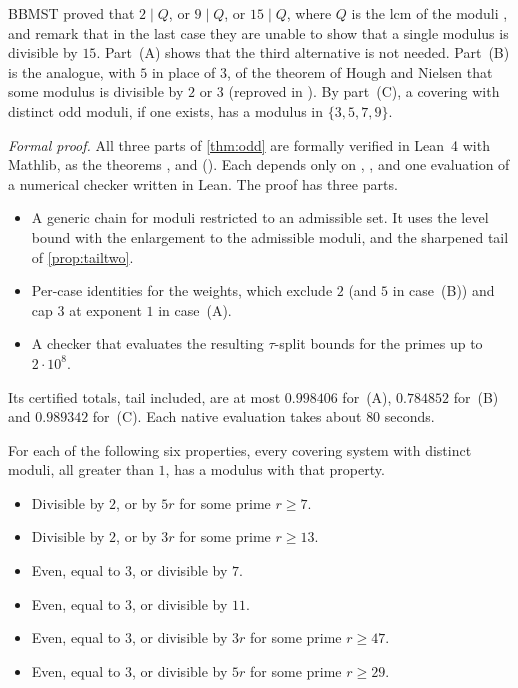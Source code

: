 BBMST proved that $2\mid Q$, or $9\mid Q$, or $15\mid Q$, where $Q$ is the lcm of the moduli
\cite[Theorem~1.4]{BBMST}, and remark that in the last case they are unable to show that a single modulus is divisible
by $15$. Part~(A) shows that the third alternative is not needed. Part~(B) is the analogue, with $5$ in place of $3$,
of the theorem of Hough and Nielsen \cite{HoughNielsen2019} that some modulus is divisible by $2$ or $3$ (reproved in
\cite[Theorem~7.1]{BBMST}). By part~(C), a covering with distinct odd moduli, if one exists, has a modulus in
$\{3,5,7,9\}$.

\emph{Formal proof.} All three parts of \cref{thm:odd} are formally verified in Lean~4 with Mathlib, as the theorems
,  and  (). Each depends only on
, ,  and one  evaluation of a numerical
checker written in Lean. The proof has three parts.
\begin{itemize}
\item A generic chain for moduli restricted to an admissible set. It uses the level bound with the enlargement to
  the admissible moduli, and the sharpened tail of \cref{prop:tailtwo}.
\item Per-case identities for the weights, which exclude $2$ (and $5$ in case~(B)) and cap $3$ at exponent $1$ in
  case~(A).
\item A checker that evaluates the resulting $\tau$-split bounds for the primes up to $2\cdot10^8$.
\end{itemize}
Its certified totals, tail included, are at most $0.998406$ for~(A), $0.784852$ for~(B) and $0.989342$ for~(C). Each native
evaluation takes about $80$ seconds.

\begin{theorem}\label{thm:odd2}
For each of the following six properties, every covering system with distinct moduli, all greater than $1$, has a
modulus with that property.
\begin{itemize}
\item[\textup{B(7)}] Divisible by $2$, or by $5r$ for some prime $r\ge7$.
\item[\textup{HN(13)}] Divisible by $2$, or by $3r$ for some prime $r\ge13$.
\item[\textup{T3(7)}] Even, equal to $3$, or divisible by $7$.
\item[\textup{T3(11)}] Even, equal to $3$, or divisible by $11$.
\item[\textup{HN$^*$(47)}] Even, equal to $3$, or divisible by $3r$ for some prime $r\ge47$.
\item[\textup{B$^*$(29)}] Even, equal to $3$, or divisible by $5r$ for some prime $r\ge29$.
\end{itemize}
\end{theorem}


